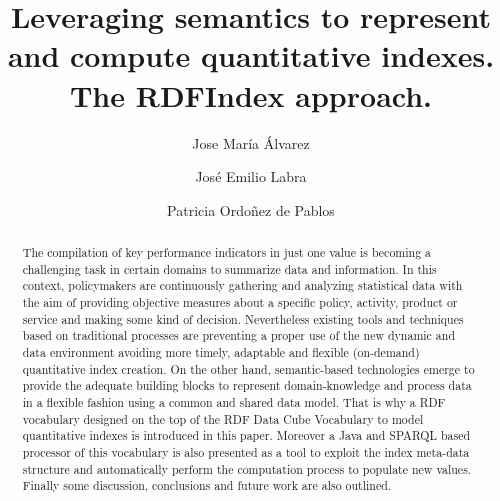 \documentclass{llncs}
\begin{document}
\title{Leveraging semantics to represent and compute quantitative indexes. \\ The RDFIndex approach.}

\author{Jose Mar\'{i}a \'{A}lvarez \and Jos\'{e} Emilio Labra  \and Patricia Ordoñez de Pablos}






\date{}

\maketitle

\renewcommand{\labelitemi}{$\bullet$}

\begin{abstract}
The compilation of key performance indicators in just one value is 
becoming a challenging task in certain domains to summarize data and information. 
In this context, policymakers are continuously gathering and analyzing statistical 
data with the aim of providing objective measures about a specific policy, activity, 
product or service and making some kind of decision. Nevertheless existing tools 
and techniques based on traditional processes are preventing a 
proper use of the new dynamic and data environment avoiding more timely, 
adaptable and flexible (on-demand) quantitative index creation. On the other hand, 
semantic-based technologies emerge to provide the adequate building blocks 
to represent domain-knowledge and process data in a flexible fashion 
using a common and shared data model. That is why a RDF vocabulary designed on 
the top of the RDF Data Cube Vocabulary to model quantitative indexes 
is introduced in this paper. Moreover a Java and SPARQL based processor 
of this vocabulary is also presented as a tool to exploit the index meta-data structure and automatically 
perform the computation process to populate new values. Finally some discussion, 
conclusions and future work are also outlined.
\end{abstract}
% 
\end{document}
